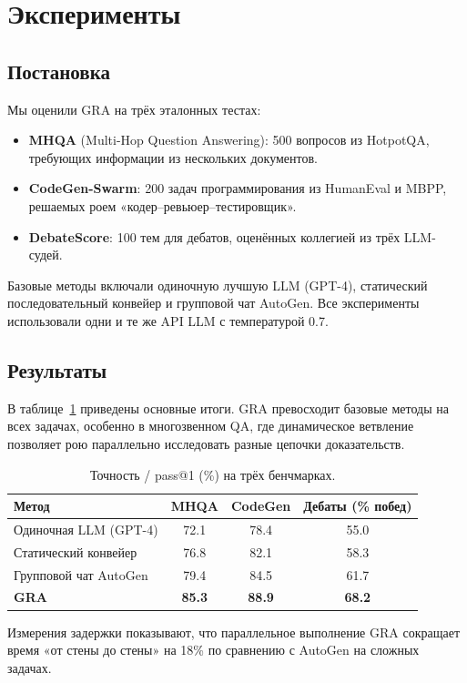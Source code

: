 \documentclass[11pt]{article}
\begin{document}
\section{Эксперименты}
\subsection{Постановка}
Мы оценили GRA на трёх эталонных тестах:
\begin{itemize}
    \item \textbf{MHQA} (Multi-Hop Question Answering): 500 вопросов из HotpotQA, требующих информации из нескольких документов.
    \item \textbf{CodeGen-Swarm}: 200 задач программирования из HumanEval и MBPP, решаемых роем «кодер–ревьюер–тестировщик».
    \item \textbf{DebateScore}: 100 тем для дебатов, оценённых коллегией из трёх LLM-судей.
\end{itemize}
Базовые методы включали одиночную лучшую LLM (GPT-4), статический последовательный конвейер и групповой чат AutoGen.
Все эксперименты использовали одни и те же API LLM с температурой 0.7.

\subsection{Результаты}
В таблице~\ref{tab:results} приведены основные итоги.
GRA превосходит базовые методы на всех задачах, особенно в многозвенном QA, где динамическое ветвление позволяет рою параллельно исследовать разные цепочки доказательств.

\begin{table}[htbp]
\centering
\caption{Точность / pass@1 (\%) на трёх бенчмарках.}
\label{tab:results}
\begin{tabular}{lccc}
\toprule
\textbf{Метод} & \textbf{MHQA} & \textbf{CodeGen} & \textbf{Дебаты (\% побед)} \\
\midrule
Одиночная LLM (GPT-4) & 72.1 & 78.4 & 55.0 \\
Статический конвейер   & 76.8 & 82.1 & 58.3 \\
Групповой чат AutoGen   & 79.4 & 84.5 & 61.7 \\
\textbf{GRA}            & \textbf{85.3} & \textbf{88.9} & \textbf{68.2} \\
\bottomrule
\end{tabular}
\end{table}

Измерения задержки показывают, что параллельное выполнение GRA сокращает время «от стены до стены» на 18\% по сравнению с AutoGen на сложных задачах.
\end{document}

